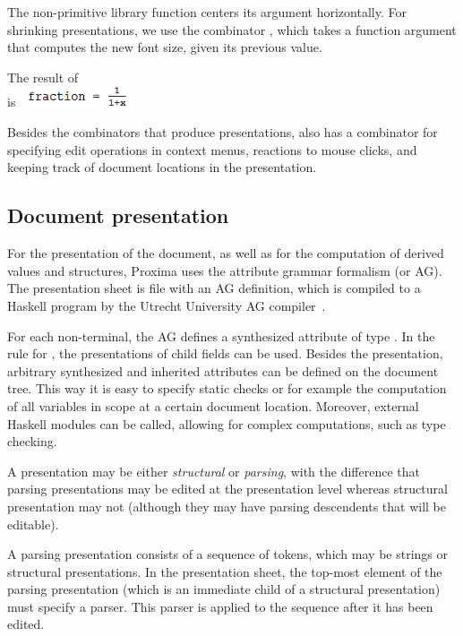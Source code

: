 \documentclass[12pt]{article}
\begin{document}
The non-primitive library function  centers its argument horizontally. For shrinking presentations, we use the combinator , which takes a function argument that computes the new font size, given its previous value.

The result of \\ 
is~~\includegraphics[width=3cm]{images/fracExample}

Besides the combinators that produce presentations, \Xprez also has a combinator for specifying edit operations in context menus, reactions to mouse clicks, and keeping track of document locations in the presentation. 


\subsection{Document presentation}

For the presentation of the document, as well as for the computation of derived values and structures, Proxima uses the attribute grammar formalism (or AG). The presentation sheet is file with an AG definition, which is compiled to a Haskell program by the Utrecht University AG compiler~\cite{swierstra08ag}.

For each non-terminal, the AG defines a synthesized attribute  of type . In the rule for , the presentations of child fields can be used. Besides the presentation, arbitrary synthesized and inherited attributes can be defined on the document tree. This way it is easy to specify static checks or for example the computation of all variables in scope at a certain document location. Moreover, external Haskell modules can be called, allowing for complex computations, such as type checking.


A presentation may be either {\em structural} or {\em parsing}, with the difference that parsing presentations may be edited at the presentation level whereas structural presentation may not (although they may have parsing descendents that will be editable). 

A parsing presentation consists of a sequence of tokens, which may be strings or structural presentations. In the presentation sheet, the top-most element of the parsing presentation (which is an immediate child of a structural presentation) must specify a parser. This parser is applied to the sequence after it has been edited.
\end{document}
